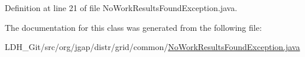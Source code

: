 Definition at line 21 of file No\-Work\-Results\-Found\-Exception.\-java.



The documentation for this class was generated from the following file\-:\begin{DoxyCompactItemize}
\item 
L\-D\-H\-\_\-\-Git/src/org/jgap/distr/grid/common/\hyperlink{_no_work_results_found_exception_8java}{No\-Work\-Results\-Found\-Exception.\-java}\end{DoxyCompactItemize}
